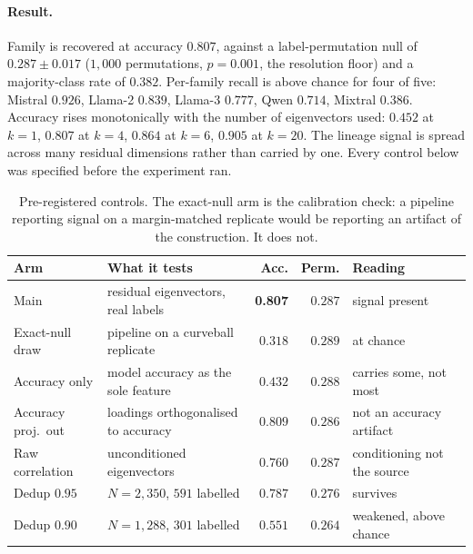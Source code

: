 \documentclass{article}
\begin{document}
\paragraph{Result.} Family is recovered at accuracy $\mathbf{0.807}$, against a label-permutation
null of $0.287\pm0.017$ ($1{,}000$ permutations, $p=0.001$, the resolution floor) and a
majority-class rate of $0.382$. Per-family recall is above chance for four of five: Mistral $0.926$,
Llama-2 $0.839$, Llama-3 $0.777$, Qwen $0.714$, Mixtral $0.386$. Accuracy rises monotonically with
the number of eigenvectors used: $0.452$ at $k=1$, $0.807$ at $k=4$, $0.864$ at $k=6$, $0.905$ at
$k=20$. The lineage signal is spread across many residual dimensions rather than carried by
one. Every control below was specified before the experiment ran.

\begin{table}[t]\centering\small
\begin{tabular}{llrrl}
\toprule
Arm & What it tests & Acc. & Perm. & Reading \\
\midrule
Main & residual eigenvectors, real labels & \textbf{0.807} & $0.287$ & signal present \\
Exact-null draw & pipeline on a curveball replicate & $0.318$ & $0.289$ & at chance \\
Accuracy only & model accuracy as the sole feature & $0.432$ & $0.288$ & carries some, not most \\
Accuracy proj.\ out & loadings orthogonalised to accuracy & $0.809$ & $0.286$ & not an accuracy artifact \\
Raw correlation & unconditioned eigenvectors & $0.760$ & $0.287$ & conditioning not the source \\
Dedup $0.95$ & $N=2{,}350$, $591$ labelled & $0.787$ & $0.276$ & survives \\
Dedup $0.90$ & $N=1{,}288$, $301$ labelled & $0.551$ & $0.264$ & weakened, above chance \\
\bottomrule
\end{tabular}
\caption{Pre-registered controls. The exact-null arm is the calibration check: a pipeline reporting
signal on a margin-matched replicate would be reporting an artifact of the construction. It does
not.}
\label{tab:controls}
\end{table}
\end{document}

